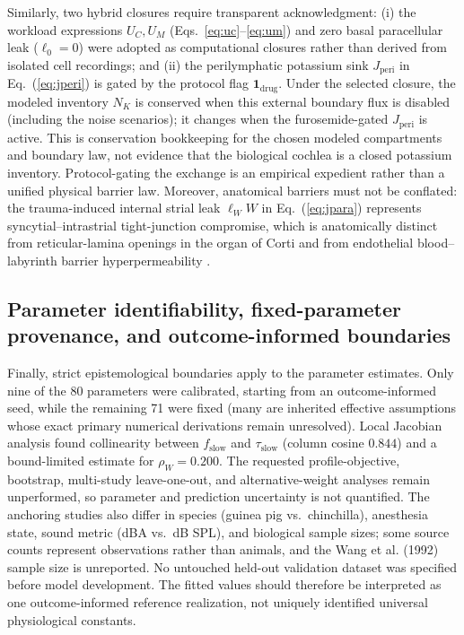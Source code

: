 \documentclass[final,5p,times]{elsarticle}
\begin{document}
Similarly, two hybrid closures require transparent acknowledgment: (i) the workload expressions \(U_C, U_M\) (Eqs.~\ref{eq:uc}--\ref{eq:um}) and zero basal paracellular leak (\(\ell_0 = 0\)) were adopted as computational closures rather than derived from isolated cell recordings; and (ii) the perilymphatic potassium sink \(J_{\mathrm{peri}}\) in Eq.~(\ref{eq:jperi}) is gated by the protocol flag \(\mathbf{1}_{\mathrm{drug}}\). Under the selected closure, the modeled inventory \(N_K\) is conserved when this external boundary flux is disabled (including the noise scenarios); it changes when the furosemide-gated \(J_{\mathrm{peri}}\) is active. This is conservation bookkeeping for the chosen modeled compartments and boundary law, not evidence that the biological cochlea is a closed potassium inventory. Protocol-gating the exchange is an empirical expedient rather than a unified physical barrier law. Moreover, anatomical barriers must not be conflated: the trauma-induced internal strial leak \(\ell_W W\) in Eq.~(\ref{eq:jpara}) represents syncytial--intrastrial tight-junction compromise, which is anatomically distinct from reticular-lamina openings in the organ of Corti \citep{Ohlemiller2018} and from endothelial blood--labyrinth barrier hyperpermeability \citep{Shi2016}.

\subsection{Parameter identifiability, fixed-parameter provenance, and outcome-informed boundaries}\label{sec:limitations-identifiability}

Finally, strict epistemological boundaries apply to the parameter estimates. Only nine of the 80 parameters were calibrated, starting from an outcome-informed seed, while the remaining 71 were fixed (many are inherited effective assumptions whose exact primary numerical derivations remain unresolved). Local Jacobian analysis found collinearity between \(f_{\mathrm{slow}}\) and \(\tau_{\mathrm{slow}}\) (column cosine \(0.844\)) and a bound-limited estimate for \(\rho_W=0.200\). The requested profile-objective, bootstrap, multi-study leave-one-out, and alternative-weight analyses remain unperformed, so parameter and prediction uncertainty is not quantified. The anchoring studies also differ in species (guinea pig vs.\ chinchilla), anesthesia state, sound metric (dBA vs.\ dB SPL), and biological sample sizes; some source counts represent observations rather than animals, and the Wang et al. (1992) sample size is unreported. No untouched held-out validation dataset was specified before model development. The fitted values should therefore be interpreted as one outcome-informed reference realization, not uniquely identified universal physiological constants.
\end{document}
